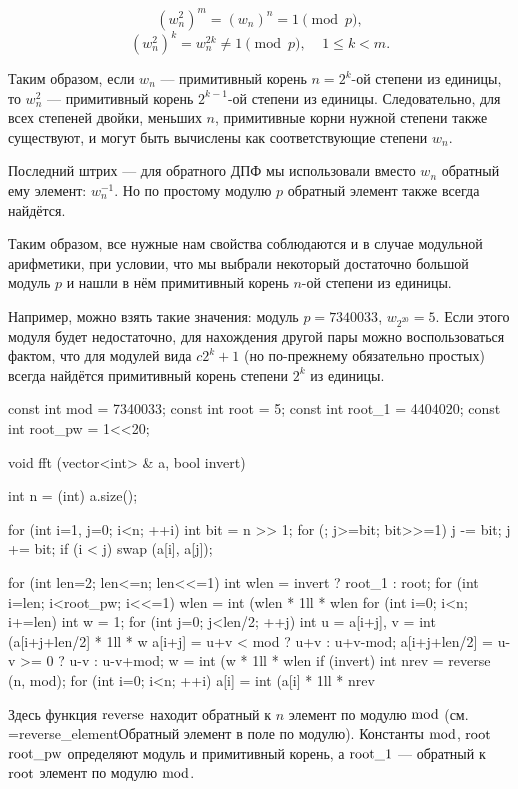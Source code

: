 $$ (w_n^2)^m = (w_n)^n = 1 \pmod p, $$
$$ (w_n^2)^k = w_n^{2k} \ne 1 {\pmod p}, ~~~~~1 \le k < m. $$

Таким образом, если $w_n$ --- примитивный корень $n=2^k$-ой степени из единицы, то $w_n^2$ --- примитивный корень $2^{k-1}$-ой степени из единицы. Следовательно, для всех степеней двойки, меньших $n$, примитивные корни нужной степени также существуют, и могут быть вычислены как соответствующие степени $w_n$.

Последний штрих --- для обратного ДПФ мы использовали вместо $w_n$ обратный ему элемент: $w_n^{-1}$. Но по простому модулю $p$ обратный элемент также всегда найдётся.

Таким образом, все нужные нам свойства соблюдаются и в случае модульной арифметики, при условии, что мы выбрали некоторый достаточно большой модуль $p$ и нашли в нём примитивный корень $n$-ой степени из единицы.

Например, можно взять такие значения: модуль $p = 7340033$, $w_{2^{20}} = 5$. Если этого модуля будет недостаточно, для нахождения другой пары можно воспользоваться фактом, что для модулей вида $c 2^k + 1$ (но по-прежнему обязательно простых) всегда найдётся примитивный корень степени $2^k$ из единицы.

\code
const int mod = 7340033;
const int root = 5;
const int root_1 = 4404020;
const int root_pw = 1<<20;

void fft (vector<int> & a, bool invert) {
	int n = (int) a.size();

	for (int i=1, j=0; i<n; ++i) {
		int bit = n >> 1;
		for (; j>=bit; bit>>=1)
			j -= bit;
		j += bit;
		if (i < j)
			swap (a[i], a[j]);
	}

	for (int len=2; len<=n; len<<=1) {
		int wlen = invert ? root_1 : root;
		for (int i=len; i<root_pw; i<<=1)
			wlen = int (wlen * 1ll * wlen %
		for (int i=0; i<n; i+=len) {
			int w = 1;
			for (int j=0; j<len/2; ++j) {
				int u = a[i+j],  v = int (a[i+j+len/2] * 1ll * w %
				a[i+j] = u+v < mod ? u+v : u+v-mod;
				a[i+j+len/2] = u-v >= 0 ? u-v : u-v+mod;
				w = int (w * 1ll * wlen %
			}
		}
	}
	if (invert) {
		int nrev = reverse (n, mod);
		for (int i=0; i<n; ++i)
			a[i] = int (a[i] * 1ll * nrev %
	}
}
\endcode

Здесь функция $\rm reverse$ находит обратный к $n$ элемент по модулю $\rm mod$ (см. \algohref=reverse_element{Обратный элемент в поле по модулю}). Константы $\rm mod$, $\rm root$ $\rm root\_pw$ определяют модуль и примитивный корень, а $\rm root\_1$ --- обратный к $\rm root$ элемент по модулю $\rm mod$.

